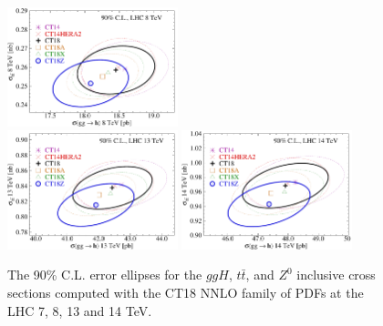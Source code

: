 \begin{figure}[p]
\begin{center}
  \includegraphics[width=0.44\textwidth]{./fig/sec6/cor_tel_ct18s_H-T__8TeV.pdf} \\
  \includegraphics[width=0.44\textwidth]{./fig/sec6/cor_tel_ct18s_H-T_13TeV.pdf}
  \includegraphics[width=0.44\textwidth]{./fig/sec6/cor_tel_ct18s_H-T_14TeV.pdf} \\
	\end{center}
    \vspace{-2ex}
	\caption{The 90\% C.L. error ellipses for the $ggH$, $t \bar t$, and $Z^0$ inclusive cross sections computed with the CT18 NNLO family of PDFs at the LHC 7, 8, 13 and 14 TeV. 
		\label{fig:corr_ellipse1}}
\end{figure}

